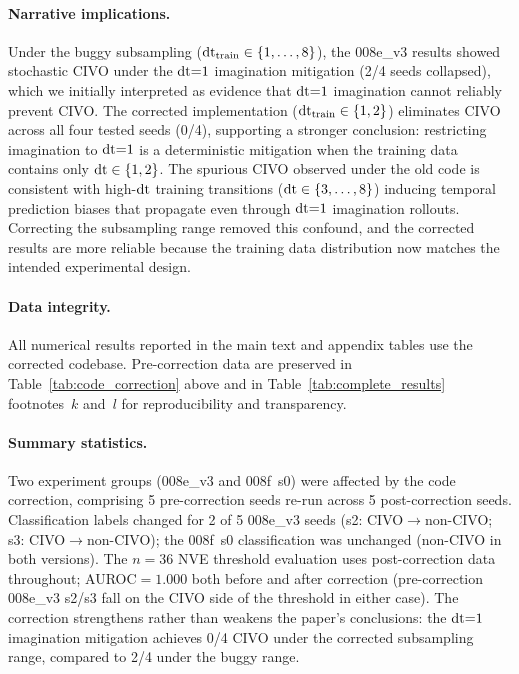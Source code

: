 \paragraph{Narrative implications.}
Under the buggy subsampling ($\mathrm{dt}_{\mathrm{train}} \in \{1,\ldots,8\}$), the 008e\_v3 results showed stochastic CIVO under the $\mathrm{dt}{=}1$ imagination mitigation (2/4 seeds collapsed), which we initially interpreted as evidence that $\mathrm{dt}{=}1$ imagination cannot reliably prevent CIVO. The corrected implementation ($\mathrm{dt}_{\mathrm{train}} \in \{1,2\}$) eliminates CIVO across all four tested seeds (0/4), supporting a stronger conclusion: restricting imagination to $\mathrm{dt}{=}1$ is a deterministic mitigation when the training data contains only $\mathrm{dt} \in \{1,2\}$. The spurious CIVO observed under the old code is consistent with high-$\mathrm{dt}$ training transitions ($\mathrm{dt} \in \{3,\ldots,8\}$) inducing temporal prediction biases that propagate even through $\mathrm{dt}{=}1$ imagination rollouts. Correcting the subsampling range removed this confound, and the corrected results are more reliable because the training data distribution now matches the intended experimental design.

\paragraph{Data integrity.}
All numerical results reported in the main text and appendix tables use the corrected codebase. Pre-correction data are preserved in Table~\ref{tab:code_correction} above and in Table~\ref{tab:complete_results} footnotes~$k$ and~$l$ for reproducibility and transparency.

\paragraph{Summary statistics.}
Two experiment groups (008e\_v3 and 008f~s0) were affected by the code correction, comprising 5 pre-correction seeds re-run across 5 post-correction seeds. Classification labels changed for 2 of 5 008e\_v3 seeds (s2: CIVO$\to$non-CIVO; s3: CIVO$\to$non-CIVO); the 008f~s0 classification was unchanged (non-CIVO in both versions). The $n{=}36$ NVE threshold evaluation uses post-correction data throughout; AUROC${=}1.000$ both before and after correction (pre-correction 008e\_v3 s2/s3 fall on the CIVO side of the threshold in either case). The correction strengthens rather than weakens the paper's conclusions: the $\mathrm{dt}{=}1$ imagination mitigation achieves 0/4 CIVO under the corrected subsampling range, compared to 2/4 under the buggy range.
